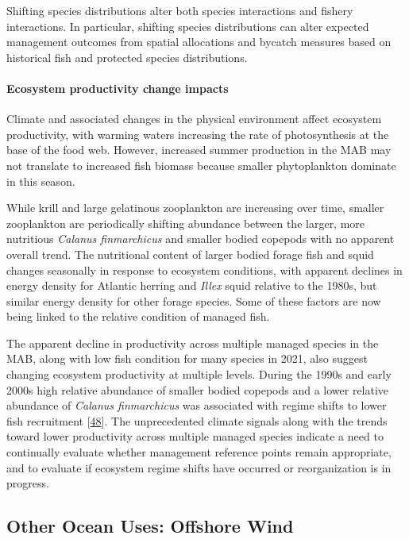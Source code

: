 \documentclass[
  10pt,
]{article}
\begin{document}
Shifting species distributions alter both species interactions and
fishery interactions. In particular, shifting species distributions can
alter expected management outcomes from spatial allocations and bycatch
measures based on historical fish and protected species distributions.

\hypertarget{ecosystem-productivity-change-impacts}{%
\paragraph{Ecosystem productivity change
impacts}\label{ecosystem-productivity-change-impacts}}

Climate and associated changes in the physical environment affect
ecosystem productivity, with warming waters increasing the rate of
photosynthesis at the base of the food web. However, increased summer
production in the MAB may not translate to increased fish biomass
because smaller phytoplankton dominate in this season.

While krill and large gelatinous zooplankton are increasing over time,
smaller zooplankton are periodically shifting abundance between the
larger, more nutritious \emph{Calanus finmarchicus} and smaller bodied
copepods with no apparent overall trend. The nutritional content of
larger bodied forage fish and squid changes seasonally in response to
ecosystem conditions, with apparent declines in energy density for
Atlantic herring and \emph{Illex} squid relative to the 1980s, but
similar energy density for other forage species. Some of these factors
are now being linked to the relative condition of managed fish.

The apparent decline in productivity across multiple managed species in
the MAB, along with low fish condition for many species in 2021, also
suggest changing ecosystem productivity at multiple levels. During the
1990s and early 2000s high relative abundance of smaller bodied copepods
and a lower relative abundance of \emph{Calanus finmarchicus} was
associated with regime shifts to lower fish recruitment
{[}\protect\hyperlink{ref-perretti_regime_2017}{48}{]}. The
unprecedented climate signals along with the trends toward lower
productivity across multiple managed species indicate a need to
continually evaluate whether management reference points remain
appropriate, and to evaluate if ecosystem regime shifts have occurred or
reorganization is in progress.

\hypertarget{other-ocean-uses-offshore-wind}{%
\subsection{Other Ocean Uses: Offshore
Wind}\label{other-ocean-uses-offshore-wind}}
\end{document}
